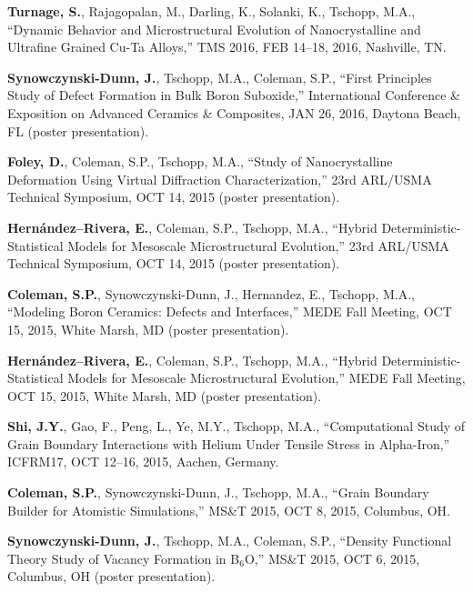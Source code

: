 \begin{cvlist}
\item
\textbf{Turnage, S.}, Rajagopalan, M., Darling, K., Solanki, K., Tschopp, M.A., ``Dynamic Behavior and Microstructural Evolution of Nanocrystalline and Ultrafine Grained Cu-Ta Alloys,''  TMS 2016, FEB 14--18, 2016, Nashville, TN.

\item
\textbf{Synowczynski-Dunn, J.}, Tschopp, M.A., Coleman, S.P., ``First Principles Study of Defect Formation in Bulk Boron Suboxide,'' International Conference \& Exposition on Advanced Ceramics \& Composites, JAN 26, 2016, Daytona Beach, FL (poster presentation).

\item
\textbf{Foley, D.}, Coleman, S.P., Tschopp, M.A., ``Study of Nanocrystalline Deformation Using Virtual Diffraction Characterization,'' 23rd ARL/USMA Technical Symposium, OCT 14, 2015 (poster presentation).

\item
\textbf{Hern\'andez--Rivera, E.}, Coleman, S.P., Tschopp, M.A., ``Hybrid Deterministic-Statistical Models for Mesoscale Microstructural Evolution,'' 23rd ARL/USMA Technical Symposium, OCT 14, 2015 (poster presentation).

\item
\textbf{Coleman, S.P.}, Synowczynski-Dunn, J., Hernandez, E., Tschopp, M.A., ``Modeling Boron Ceramics: Defects and Interfaces,'' MEDE Fall Meeting, OCT 15, 2015, White Marsh, MD (poster presentation).

\item
\textbf{Hern\'andez--Rivera, E.}, Coleman, S.P., Tschopp, M.A., ``Hybrid Deterministic-Statistical Models for Mesoscale Microstructural Evolution,'' MEDE Fall Meeting, OCT 15, 2015, White Marsh, MD (poster presentation).

\item
\textbf{Shi, J.Y.}, Gao, F., Peng, L., Ye, M.Y., Tschopp, M.A., ``Computational Study of Grain Boundary Interactions with Helium Under Tensile Stress in Alpha-Iron,'' ICFRM17, OCT 12--16, 2015, Aachen, Germany.

\item
\textbf{Coleman, S.P.}, Synowczynski-Dunn, J., Tschopp, M.A., ``Grain Boundary Builder for Atomistic Simulations,'' MS\&T 2015, OCT 8, 2015, Columbus, OH.

\item
\textbf{Synowczynski-Dunn, J.}, Tschopp, M.A., Coleman, S.P.,  ``Density Functional Theory Study of Vacancy Formation in B$_6$O,'' MS\&T 2015, OCT 6, 2015, Columbus, OH (poster presentation).


\end{cvlist}
